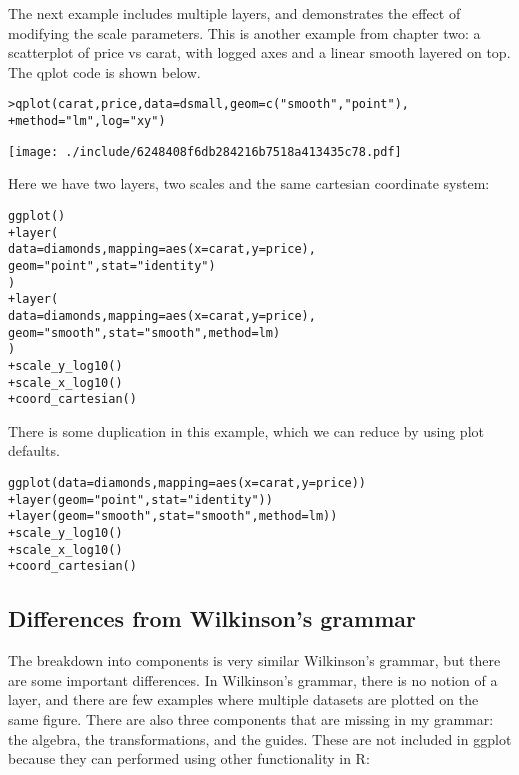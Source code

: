 The next example includes multiple layers, and demonstrates the effect of modifying the scale parameters.  This is another example from chapter two: a scatterplot of price vs carat, with logged axes and a linear smooth layered on top.  The qplot code is shown below.

\begin{alltt}
> qplot(carat, price, data = dsmall, geom = c("smooth", "point"), 
+     method = "lm", log = "xy")
\end{alltt}
\texttt{[image: ./include/6248408f6db284216b7518a413435c78.pdf]}
\begin{alltt}

\end{alltt}

Here we have two layers, two scales and the same cartesian coordinate system:

\begin{alltt}
ggplot() 
+ layer(
   data = diamonds, mapping = aes(x = carat, y = price),
   geom = "point", stat = "identity")
  )
+ layer(
   data = diamonds, mapping = aes(x = carat, y = price),
   geom = "smooth", stat = "smooth", method = lm)
  )
+ scale_y_log10()
+ scale_x_log10()
+ coord_cartesian()
\end{alltt}

There is some duplication in this example, which we can reduce by using plot defaults.

\begin{alltt}
ggplot(data = diamonds, mapping = aes(x = carat, y = price)) 
+ layer(geom = "point", stat = "identity"))
+ layer(geom = "smooth", stat = "smooth", method = lm))
+ scale_y_log10()
+ scale_x_log10()
+ coord_cartesian()
\end{alltt}

\subsection{Differences from Wilkinson's grammar}

The breakdown into components is very similar Wilkinson's grammar, but there are some important differences.  In Wilkinson's grammar, there is no notion of a layer, and there are few examples where multiple datasets are plotted on the same figure.  There are also three components that are missing in my grammar: the algebra, the transformations, and the guides.  These are not included in ggplot because they can performed using other functionality in R:

